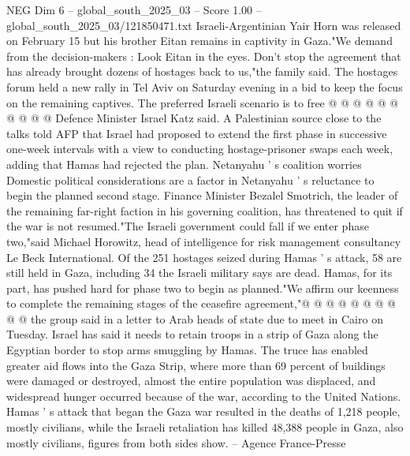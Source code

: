 \begin{textsample}{NEG Dim 6 – global\_south\_2025\_03 – Score 1.00 – global\_south\_2025\_03/121850471.txt}
Israeli-Argentinian Yair Horn was released on February 15 but his brother Eitan remains in captivity in Gaza."We demand from the decision-makers : Look Eitan in the eyes.
Don't stop the agreement that has already brought dozens of hostages back to us,"the family said.
The hostages forum held a new rally in Tel Aviv on Saturday evening in a bid to keep the focus on the remaining captives.
The preferred Israeli scenario is to free @ @ @ @ @ @ @ @ @ @ Defence Minister Israel Katz said.
A Palestinian source close to the talks told AFP that Israel had proposed to extend the first phase in successive one-week intervals with a view to conducting hostage-prisoner swaps each week, adding that Hamas had rejected the plan.
Netanyahu ' s coalition worries Domestic political considerations are a factor in Netanyahu ' s reluctance to begin the planned second stage.
Finance Minister Bezalel Smotrich, the leader of the remaining far-right faction in his governing coalition, has threatened to quit if the war is not resumed."The Israeli government could fall if we enter phase two,"said Michael Horowitz, head of intelligence for risk management consultancy Le Beck International.
Of the 251 hostages seized during Hamas ' s attack, 58 are still held in Gaza, including 34 the Israeli military says are dead.
Hamas, for its part, has pushed hard for phase two to begin as planned."We affirm our keenness to complete the remaining stages of the ceasefire agreement,"@ @ @ @ @ @ @ @ @ @ the group said in a letter to Arab heads of state due to meet in Cairo on Tuesday.
Israel has said it needs to retain troops in a strip of Gaza along the Egyptian border to stop arms smuggling by Hamas.
The truce has enabled greater aid flows into the Gaza Strip, where more than 69 percent of buildings were damaged or destroyed, almost the entire population was displaced, and widespread hunger occurred because of the war, according to the United Nations.
Hamas ' s attack that began the Gaza war resulted in the deaths of 1,218 people, mostly civilians, while the Israeli retaliation has killed 48,388 people in Gaza, also mostly civilians, figures from both sides show. -- Agence France-Presse

\end{textsample}

